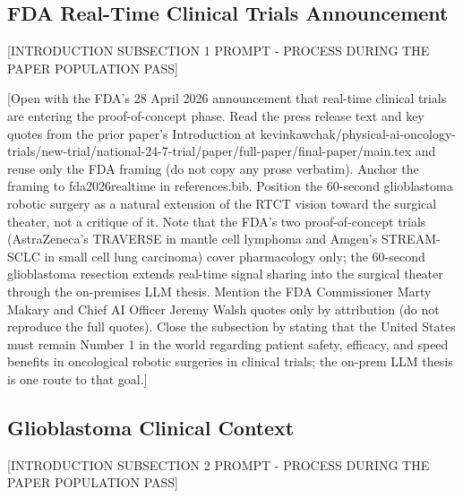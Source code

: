 
\subsection{FDA Real-Time Clinical Trials Announcement}
\label{sec:intro-fda}

[INTRODUCTION SUBSECTION 1 PROMPT - PROCESS DURING THE PAPER POPULATION PASS]

[Open with the FDA's 28 April 2026 announcement that real-time clinical
trials are entering the proof-of-concept phase. Read the press release
text and key quotes from the prior paper's Introduction at
kevinkawchak/physical-ai-oncology-trials/new-trial/national-24-7-trial/paper/full-paper/final-paper/main.tex
and reuse only the FDA framing (do not copy any prose verbatim).
Anchor the framing to fda2026realtime in references.bib. Position the
60-second glioblastoma robotic surgery as a natural extension of the
RTCT vision toward the surgical theater, not a critique of it. Note
that the FDA's two proof-of-concept trials (AstraZeneca's TRAVERSE in
mantle cell lymphoma and Amgen's STREAM-SCLC in small cell lung
carcinoma) cover pharmacology only; the 60-second glioblastoma
resection extends real-time signal sharing into the surgical theater
through the on-premises LLM thesis. Mention the FDA Commissioner Marty
Makary and Chief AI Officer Jeremy Walsh quotes only by attribution
(do not reproduce the full quotes). Close the subsection by stating
that the United States must remain Number 1 in the world regarding
patient safety, efficacy, and speed benefits in oncological robotic
surgeries in clinical trials; the on-prem LLM thesis is one route to
that goal.]

\subsection{Glioblastoma Clinical Context}
\label{sec:intro-gbm}

[INTRODUCTION SUBSECTION 2 PROMPT - PROCESS DURING THE PAPER POPULATION PASS]

